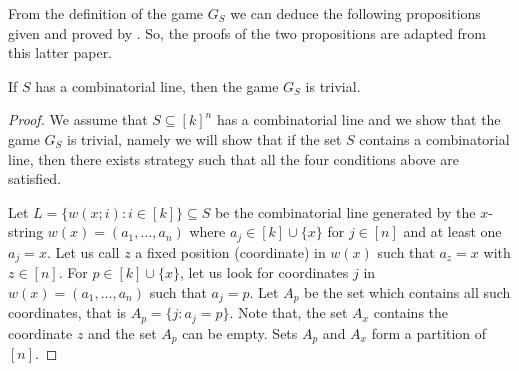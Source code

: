 From the definition of the game $G_S$ we can deduce the following propositions given and proved by \cite*{hkazla2016forbidden}. So, the proofs of the two  propositions are adapted from this latter paper.  
\begin{pro} If $S$ has a combinatorial line, then the game $G_S$ is trivial. \label{pr1}	\end{pro}
\begin{proof}
We assume that $S \subseteq [k]^n$ has a combinatorial line and we show that the game $G_S$ is trivial, namely we will show that if the set $S$ contains a combinatorial line, then there exists strategy such that 
all the four conditions above are satisfied. 


Let  $L=\{w(x;i): i \in [k]\} \subseteq S $ be the combinatorial line generated by the $x$-string $w(x)=(a_1,\ldots, a_n)$ where $a_j \in [k]  \cup \{x\}$ for $j \in [n]$ and at least one $a_j=x.$ Let us call $z$ a fixed position (coordinate) in $w(x)$ such that $a_z=x$ with $z \in [n].$ For  $p \in [k] \cup \{x\}$, let us look for coordinates $j$ in  $w(x)=(a_1,\ldots, a_n)$ such that $a_j=p.$  Let $A_p$ be the set which contains all such coordinates, that is $A_p=\{j: a_j=p\}.$ Note that, the set $A_x$ contains the coordinate $z$ and the set $A_p$ can be empty.  Sets $A_p$  and $A_x$ form a  partition of $[n].$ %


\end{proof}
